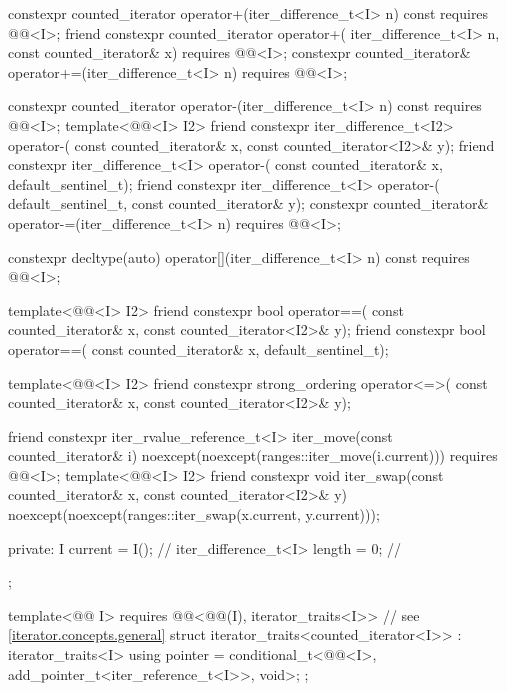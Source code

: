 \begin{codeblock}
{{    constexpr counted_iterator operator+(iter_difference_t<I> n) const
      requires @@<I>;
    friend constexpr counted_iterator operator+(
      iter_difference_t<I> n, const counted_iterator& x)
        requires @@<I>;
    constexpr counted_iterator& operator+=(iter_difference_t<I> n)
      requires @@<I>;

    constexpr counted_iterator operator-(iter_difference_t<I> n) const
      requires @@<I>;
    template<@@<I> I2>
      friend constexpr iter_difference_t<I2> operator-(
        const counted_iterator& x, const counted_iterator<I2>& y);
    friend constexpr iter_difference_t<I> operator-(
      const counted_iterator& x, default_sentinel_t);
    friend constexpr iter_difference_t<I> operator-(
      default_sentinel_t, const counted_iterator& y);
    constexpr counted_iterator& operator-=(iter_difference_t<I> n)
      requires @@<I>;

    constexpr decltype(auto) operator[](iter_difference_t<I> n) const
      requires @@<I>;

    template<@@<I> I2>
      friend constexpr bool operator==(
        const counted_iterator& x, const counted_iterator<I2>& y);
    friend constexpr bool operator==(
      const counted_iterator& x, default_sentinel_t);

    template<@@<I> I2>
      friend constexpr strong_ordering operator<=>(
        const counted_iterator& x, const counted_iterator<I2>& y);

    friend constexpr iter_rvalue_reference_t<I> iter_move(const counted_iterator& i)
      noexcept(noexcept(ranges::iter_move(i.current)))
        requires @@<I>;
    template<@@<I> I2>
      friend constexpr void iter_swap(const counted_iterator& x, const counted_iterator<I2>& y)
        noexcept(noexcept(ranges::iter_swap(x.current, y.current)));

  private:
    I current = I();                    // \expos
    iter_difference_t<I> length = 0;    // \expos
  };

  template<@@ I>
    requires @@<@@(I), iterator_traits<I>>   // see \ref{iterator.concepts.general}
  struct iterator_traits<counted_iterator<I>> : iterator_traits<I> {
    using pointer = conditional_t<@@<I>,
                                  add_pointer_t<iter_reference_t<I>>, void>;
  };
}
\end{codeblock}

